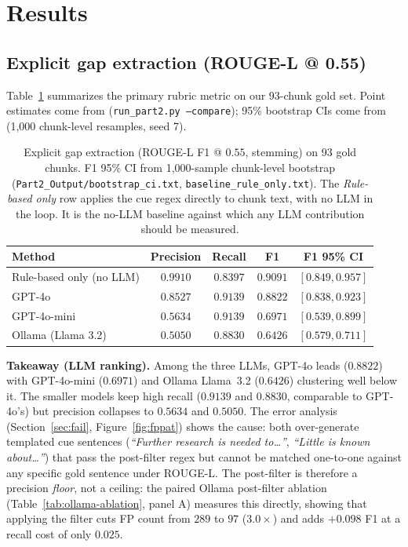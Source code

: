 \documentclass{article}
\begin{document}
\section{Results}
\label{sec:results}

\subsection{Explicit gap extraction (ROUGE-L @ 0.55)}
Table~\ref{tab:explicit} summarizes the primary rubric metric on our 93-chunk gold set. Point estimates come from  (\texttt{run\_part2.py --compare}); 95\% bootstrap CIs come from  (1{,}000 chunk-level resamples, seed 7).

\begin{table}[h]
\centering
\caption{Explicit gap extraction (ROUGE-L F1 @ $0.55$, stemming) on 93 gold chunks. F1 95\% CI from 1{,}000-sample chunk-level bootstrap (\texttt{Part2\_Output/bootstrap\_ci.txt}, \texttt{baseline\_rule\_only.txt}). The \emph{Rule-based only} row applies the cue regex directly to chunk text, with no LLM in the loop. It is the no-LLM baseline against which any LLM contribution should be measured.}
\label{tab:explicit}
\begin{tabular}{lccc c}
\toprule
Method             & Precision & Recall & F1 & F1 95\% CI \\
\midrule
Rule-based only (no LLM) & $\mathbf{0.9910}$ & $0.8397$ & $\mathbf{0.9091}$ & $[0.849, 0.957]$ \\
\midrule
GPT-4o             & $0.8527$ & $0.9139$ & $0.8822$ & $[0.838, 0.923]$ \\
GPT-4o-mini        & $0.5634$ & $\mathbf{0.9139}$ & $0.6971$         & $[0.539, 0.899]$ \\
Ollama (Llama 3.2) & $0.5050$ & $0.8830$ & $0.6426$         & $[0.579, 0.711]$ \\
\bottomrule
\end{tabular}
\end{table}

\noindent\textbf{Takeaway (LLM ranking).} Among the three LLMs, GPT-4o leads ($0.8822$) with GPT-4o-mini ($0.6971$) and Ollama Llama~3.2 ($0.6426$) clustering well below it. The smaller models keep high recall ($0.9139$ and $0.8830$, comparable to GPT-4o's) but precision collapses to $0.5634$ and $0.5050$. The error analysis (Section~\ref{sec:fail}, Figure~\ref{fig:fppat}) shows the cause: both over-generate templated cue sentences (\emph{``Further research is needed to\ldots''}, \emph{``Little is known about\ldots''}) that pass the post-filter regex but cannot be matched one-to-one against any specific gold sentence under ROUGE-L. The post-filter is therefore a precision \emph{floor}, not a ceiling: the paired Ollama post-filter ablation (Table~\ref{tab:ollama-ablation}, panel A) measures this directly, showing that applying the filter cuts FP count from $289$ to $97$ ($3.0\times$) and adds $+0.098$ F1 at a recall cost of only $0.025$.
\end{document}
